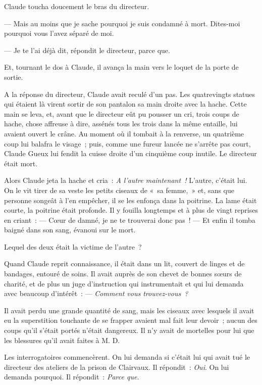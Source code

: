 \documentclass[french,twoside]{book} %
\begin{document}
Claude toucha doucement le bras du directeur.\par
— Mais au moins que je sache pourquoi je suis condamné à mort. Dites-moi pourquoi vous l’avez séparé de moi.\par
— Je te l’ai déjà dit, répondit le directeur, parce que.\par
Et, tournant le dos à Claude, il avança la main vers le loquet de la porte de sortie.\par
A la réponse du directeur, Claude avait reculé d’un pas. Les quatrevingts statues qui étaient là virent sortir de son pantalon sa main droite avec la hache. Cette main se leva, et, avant que le directeur eût pu pousser un cri, trois coups de hache, chose affreuse à dire, assénés tous les trois dans la même entaille, lui avaient ouvert le crâne. Au moment où il tombait à la renverse, un quatrième coup lui balafra le visage ; puis, comme une fureur lancée ne s’arrête pas court, Claude Gueux lui fendit la cuisse droite d’un cinquième coup inutile. Le directeur était mort.\par
Alors Claude jeta la hache et cria : \emph{A l’autre maintenant !} L’autre, c’était lui. On le vit tirer de sa veste les petits ciseaux de « sa femme, » et, sans que personne songeât à l’en empêcher, il se les enfonça dans la poitrine. La lame était courte, la poitrine était  profonde. Il y fouilla longtemps et à plus de vingt reprises en criant : — Cœur de damné, je ne te trouverai donc pas ! — Et enfin il tomba baigné dans son sang, évanoui sur le mort.\par
Lequel des deux était la victime de l’autre ?\par
Quand Claude reprit connaissance, il était dans un lit, couvert de linges et de bandages, entouré de soins. Il avait auprès de son chevet de bonnes sœurs de charité, et de plus un juge d’instruction qui instrumentait et qui lui demanda avec beaucoup d’intérêt : — \emph{Comment vous trouvez-vous ?}\par
Il avait perdu une grande quantité de sang, mais les ciseaux avec lesquels il avait eu la superstition touchante de se frapper avaient mal fait leur devoir ; aucun des coups qu’il s’était portés n’était dangereux. Il n’y avait de mortelles pour lui que les blessures qu’il avait faites à M. D.\par
Les interrogatoires commencèrent. On lui demanda si c’était lui qui avait tué le directeur des ateliers de la prison de Clairvaux. Il répondit : \emph{Oui}. On lui demanda pourquoi. Il répondit : \emph{Parce que.}\par
\end{document}
